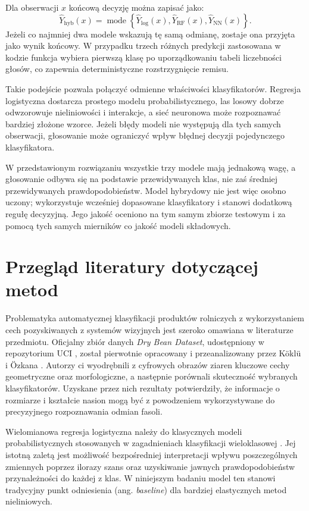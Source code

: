 \documentclass{report}
\begin{document}
Dla obserwacji $x$ końcową decyzję można zapisać jako:
\[
\hat{Y}_{\mathrm{hyb}}(x)=\operatorname{mode}\left\{
\hat{Y}_{\mathrm{log}}(x),
\hat{Y}_{\mathrm{RF}}(x),
\hat{Y}_{\mathrm{NN}}(x)
\right\}.
\]
Jeżeli co najmniej dwa modele wskazują tę samą odmianę, zostaje ona przyjęta jako wynik końcowy. W przypadku trzech różnych predykcji zastosowana w kodzie funkcja wybiera pierwszą klasę po uporządkowaniu tabeli liczebności głosów, co zapewnia deterministyczne rozstrzygnięcie remisu.

Takie podejście pozwala połączyć odmienne właściwości klasyfikatorów. Regresja logistyczna dostarcza prostego modelu probabilistycznego, las losowy dobrze odwzorowuje nieliniowości i interakcje, a sieć neuronowa może rozpoznawać bardziej złożone wzorce. Jeżeli błędy modeli nie występują dla tych samych obserwacji, głosowanie może ograniczyć wpływ błędnej decyzji pojedynczego klasyfikatora.

W przedstawionym rozwiązaniu wszystkie trzy modele mają jednakową wagę, a głosowanie odbywa się na podstawie przewidywanych klas, nie zaś średniej przewidywanych prawdopodobieństw. Model hybrydowy nie jest więc osobno uczony; wykorzystuje wcześniej dopasowane klasyfikatory i stanowi dodatkową regułę decyzyjną. Jego jakość oceniono na tym samym zbiorze testowym i za pomocą tych samych mierników co jakość modeli składowych.


\section{Przegląd literatury dotyczącej metod}

Problematyka automatycznej klasyfikacji produktów rolniczych z wykorzystaniem cech pozyskiwanych z systemów wizyjnych jest szeroko omawiana w literaturze przedmiotu. Oficjalny zbiór danych \textit{Dry Bean Dataset}, udostępniony w repozytorium UCI \cite{uciDryBean}, został pierwotnie opracowany i przeanalizowany przez Köklü i Özkana \cite{koklu2020}. Autorzy ci wyodrębnili z cyfrowych obrazów ziaren kluczowe cechy geometryczne oraz morfologiczne, a następnie porównali skuteczność wybranych klasyfikatorów. Uzyskane przez nich rezultaty potwierdziły, że informacje o rozmiarze i kształcie nasion mogą być z powodzeniem wykorzystywane do precyzyjnego rozpoznawania odmian fasoli.

Wielomianowa regresja logistyczna należy do klasycznych modeli probabilistycznych stosowanych w zagadnieniach klasyfikacji wieloklasowej \cite{hastie2009, koronacki2005}. Jej istotną zaletą jest możliwość bezpośredniej interpretacji wpływu poszczególnych zmiennych poprzez ilorazy szans oraz uzyskiwanie jawnych prawdopodobieństw przynależności do każdej z klas. W niniejszym badaniu model ten stanowi tradycyjny punkt odniesienia (ang. \textit{baseline}) dla bardziej elastycznych metod nieliniowych.
\end{document}

